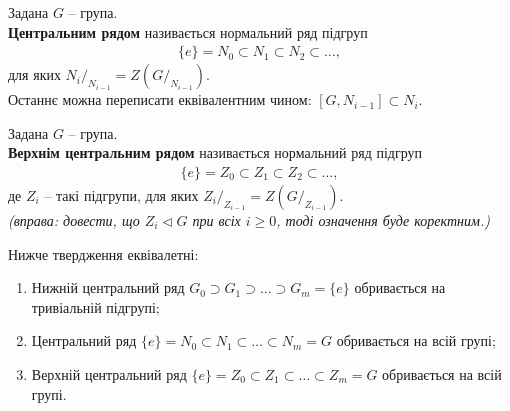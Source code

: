 \documentclass{math_library}
\begin{document}
\begin{definition}
Задана $G$ -- група.\\
\textbf{Центральним рядом} називається нормальний ряд підгруп
\begin{align*}
\{e\} = N_0 \subset N_1 \subset N_2 \subset \dots,
\end{align*}
для яких ${N_i}/_{N_{i-1}} = Z\left(G/_{N_{i-1}}\right)$.\\
Останнє можна переписати еквівалентним чином: $[G, N_{i-1}] \subset N_i$.
\end{definition}

\begin{definition}
Задана $G$ -- група.\\
\textbf{Верхнім центральним рядом} називається нормальний ряд підгруп
\begin{align*}
\{e\} = Z_0 \subset Z_1 \subset Z_2 \subset \dots,
\end{align*}
де $Z_i$ -- такі підгрупи, для яких ${Z_i}/_{Z_{i-1}} = Z(G/_{Z_{i-1}})$.\\
\textit{(вправа: довести, що $Z_i \triangleleft G$ при всіх $i \geq 0$, тоді означення буде коректним.)}
\end{definition}

\begin{proposition}
Нижче твердження еквівалетні:
\begin{enumerate}[nosep,wide=0pt,label={\arabic*)}]
\item Нижній центральний ряд $G_0 \supset G_1 \supset \dots \supset G_m = \{e\}$ обривається на тривіальній підгрупі;
\item Центральний ряд $\{e\} = N_0 \subset N_1 \subset \dots \subset N_m = G$ обривається на всій групі;
\item Верхній центральний ряд $\{e\} = Z_0 \subset Z_1 \subset \dots \subset Z_m = G$ обривається на всій групі.
\end{enumerate}
\end{proposition}
\end{document}
